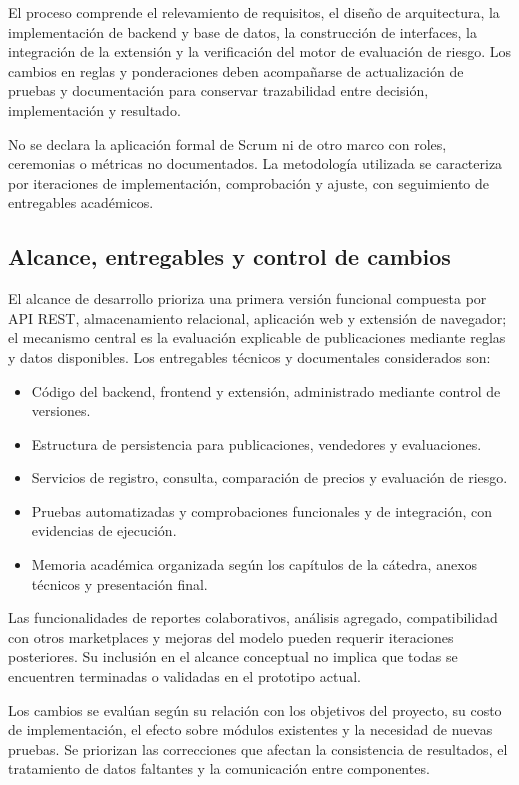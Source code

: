 El proceso comprende el relevamiento de requisitos, el diseño de arquitectura, la implementación de backend y base de datos, la construcción de interfaces, la integración de la extensión y la verificación del motor de evaluación de riesgo. Los cambios en reglas y ponderaciones deben acompañarse de actualización de pruebas y documentación para conservar trazabilidad entre decisión, implementación y resultado.

No se declara la aplicación formal de Scrum ni de otro marco con roles, ceremonias o métricas no documentados. La metodología utilizada se caracteriza por iteraciones de implementación, comprobación y ajuste, con seguimiento de entregables académicos.

\subsection{Alcance, entregables y control de cambios}\label{subsec:ml-alcance-gestion}

El alcance de desarrollo prioriza una primera versión funcional compuesta por API REST, almacenamiento relacional, aplicación web y extensión de navegador; el mecanismo central es la evaluación explicable de publicaciones mediante reglas y datos disponibles. Los entregables técnicos y documentales considerados son:

\begin{itemize}
    \item Código del backend, frontend y extensión, administrado mediante control de versiones.
    \item Estructura de persistencia para publicaciones, vendedores y evaluaciones.
    \item Servicios de registro, consulta, comparación de precios y evaluación de riesgo.
    \item Pruebas automatizadas y comprobaciones funcionales y de integración, con evidencias de ejecución.
    \item Memoria académica organizada según los capítulos de la cátedra, anexos técnicos y presentación final.
\end{itemize}

Las funcionalidades de reportes colaborativos, análisis agregado, compatibilidad con otros marketplaces y mejoras del modelo pueden requerir iteraciones posteriores. Su inclusión en el alcance conceptual no implica que todas se encuentren terminadas o validadas en el prototipo actual.

Los cambios se evalúan según su relación con los objetivos del proyecto, su costo de implementación, el efecto sobre módulos existentes y la necesidad de nuevas pruebas. Se priorizan las correcciones que afectan la consistencia de resultados, el tratamiento de datos faltantes y la comunicación entre componentes.

